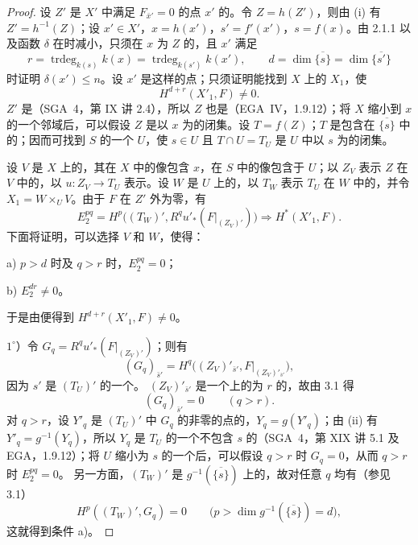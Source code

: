\begin{proof}
设 $Z'$ 是 $X'$ 中满足 $F_{\bar x'}=0$ 的点 $x'$ 的。令 $Z=h(Z')$，则由 (i) 有 $Z'=h^{-1}(Z)$；设 $x'\in X'$，$x=h(x')$，$s'=f'(x')$，$s=f(x)$。由 2.1.1 以及函数 $\delta$ 在时减小，只须在 $x$ 为 $Z$ 的，且 $x'$ 满足
\[
r=\operatorname{trdeg}_{k(s)}k(x)=\operatorname{trdeg}_{k(s')}k(x'),
\qquad d=\dim\overline{\{s\}}=\dim\overline{\{s'\}}
\]
时证明 $\delta(x')\leq n$。设 $x'$ 是这样的点；只须证明能找到 $X$ 上的 $X_1$，使
\[
H^{d+r}(X'_1,F)\ne0.
\]
 $Z'$ 是（SGA~4，第 IX 讲 2.4），所以 $Z$ 也是（EGA~IV，1.9.12）；将 $X$ 缩小到 $x$ 的一个邻域后，可以假设 $Z$ 是以 $x$ 为的闭集。设 $T=f(Z)$；$T$ 是包含在 $\overline{\{s\}}$ 中的；因而可找到 $S$ 的一个 $U$，使 $s\in U$ 且 $T\cap U=T_U$ 是 $U$ 中以 $s$ 为的闭集。

设 $V$ 是 $X$ 上的，其在 $X$ 中的像包含 $x$，在 $S$ 中的像包含于 $U$；以 $Z_V$ 表示 $Z$ 在 $V$ 中的，以 $u:Z_V\to T_U$ 表示。设 $W$ 是 $U$ 上的，以 $T_W$ 表示 $T_U$ 在 $W$ 中的，并令 $X_1=W\times_UV$。由于 $F$ 在 $Z'$ 外为零，有
\[
E_2^{pq}=H^p\bigl((T_W)',R^qu'_*(F|_{(Z_V)'})\bigr)
\Longrightarrow H^*(X'_1,F).
\]
下面将证明，可以选择 $V$ 和 $W$，使得：

\quad a) $p>d$ 时及 $q>r$ 时，$E_2^{pq}=0$；

\quad b) $E_2^{dr}\ne0$。

于是由便得到 $H^{d+r}(X'_1,F)\ne0$。

$1^\circ$）令 $G_q=R^qu'_*(F|_{(Z_V)'})$；则有
\[
(G_q)_{\bar s'}=H^q\bigl((Z_V)'_{\bar s'},F|_{(Z_V)'_{\bar s'}}\bigr),
\]
因为 $s'$ 是 $(T_U)'$ 的一个。 $(Z_V)'_{\bar s'}$ 是一个上的为 $r$ 的，故由 3.1 得
\[
(G_q)_{\bar s'}=0\qquad(q>r).
\]
对 $q>r$，设 $Y'_q$ 是 $(T_U)'$ 中 $G_q$ 的非零的点的，$Y_q=g(Y'_q)$；由 (ii) 有 $Y'_q=g^{-1}(Y_q)$，所以 $Y_q$ 是 $T_U$ 的一个不包含 $s$ 的（SGA~4，第 XIX 讲 5.1 及 EGA，1.9.12）；将 $U$ 缩小为 $s$ 的一个后，可以假设 $q>r$ 时 $G_q=0$，从而 $q>r$ 时 $E_2^{pq}=0$。
另一方面，$(T_W)'$ 是 $g^{-1}(\overline{\{s\}})$ 上的，故对任意 $q$ 均有（参见 3.1）
\[
H^p((T_W)',G_q)=0\qquad\bigl(p>\dim g^{-1}(\overline{\{s\}})=d\bigr),
\]
这就得到条件 a)。


\end{proof}
